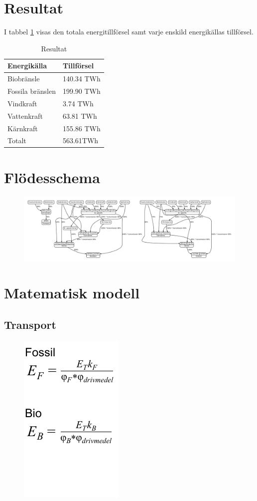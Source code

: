 \documentclass[a4paper,11pt,fleqn]{article}
\begin{document}
\newpage

\section{Resultat}

I tabbel \ref{resultat} visas den totala energitillförsel samt varje enskild energikällas tillförsel.
\begin{table}[h!]
	\centering
	\begin{tabular}{||l l||}
		\hline
		Energikälla & Tillförsel \\
		\hline
		\hline
		Biobränsle & 140.34 TWh\\
		Fossila bränslen & 199.90 TWh \\
		Vindkraft & 3.74 TWh\\
		Vattenkraft & 63.81 TWh\\
		Kärnkraft & 155.86 TWh\\
		\hline
		\hline
		Totalt & 563.61TWh\\
		\hline
	\end{tabular}
	\caption{Resultat}
	\label{resultat}
\end{table}


\appendix
\section{Flödesschema}
\begin{figure}[h!]
	\centering 
 		\includegraphics[scale = 0.2]{diagram.pdf}
		\label{diagram}
\end{figure}
\section {Matematisk modell}
\subsection{Transport}
\begin{figure}[h!]
	\centering 
 		\includegraphics[scale = 0.75]{transport2.pdf}
		\label{diagram}
\end{figure}
\end{document}
